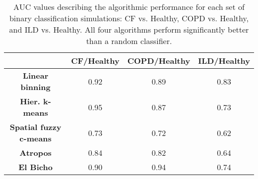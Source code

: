 
\begin{table*}[!htb]
 \centering
 \begin{tabular}{c c c c}
   \toprule
   {} & {\bf CF/Healthy } & {\bf COPD/Healthy} & {\bf ILD/Healthy} \\
   \hline
   {\bf Linear binning} & 0.92  &  0.89  &  0.83  \\
   {\bf Hier. k-means} & 0.95  &  0.87  &  0.73  \\
   {\bf Spatial fuzzy c-means} & 0.73 & 0.72 & 0.62 \\
   {\bf Atropos} &  0.84  &  0.82  &  0.64  \\
   {\bf El Bicho} &  0.90  &  0.94  &  0.74  \\
   \hline
   \bottomrule
   \end{tabular}
 \caption{AUC values describing the algorithmic performance for each set of binary
          classification simulations: CF vs. Healthy, COPD vs. Healthy, and
          ILD vs. Healthy.  All four algorithms perform significantly better than a
          random classifier.
          }
 \label{table:auc}
\end{table*}
